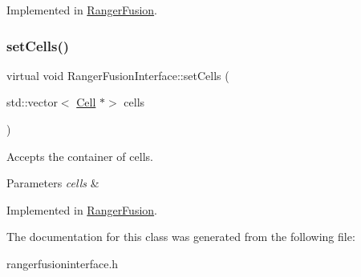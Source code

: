 Implemented in \hyperlink{classRangerFusion_a7215e5405e808b5a853984e2b70ed6ad}{Ranger\+Fusion}.

\mbox{\label{classRangerFusionInterface_ab8fdee0050521767d33179a63da91e4f}} 
\subsubsection{\texorpdfstring{set\+Cells()}{setCells()}}
{\footnotesize\ttfamily virtual void Ranger\+Fusion\+Interface\+::set\+Cells (\begin{DoxyParamCaption}\item[{std\+::vector$<$ \hyperlink{classCell}{Cell} $\ast$$>$}]{cells }\end{DoxyParamCaption})\hspace{0.3cm}{\ttfamily [pure virtual]}}



Accepts the container of cells. 


\begin{DoxyParams}{Parameters}
{\em cells} & \\
\hline
\end{DoxyParams}


Implemented in \hyperlink{classRangerFusion_a9b69869bd1e3bca155bcecbad5ea463b}{Ranger\+Fusion}.



The documentation for this class was generated from the following file\+:\begin{DoxyCompactItemize}
\item 
rangerfusioninterface.\+h\end{DoxyCompactItemize}
